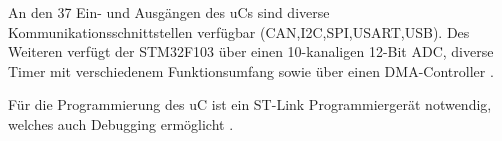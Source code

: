 \smallskip

An den 37 Ein- und Ausgängen des \acp{uC} sind diverse Kommunikationsschnittstellen verfügbar (\acs{CAN}\label{acro:CAN},\acs{I2C}\label{acro:I2C},\acs{SPI},\acs{USART},\acs{USB}\label{acro:USB}). 
Des Weiteren verfügt der STM32F103 über einen 10-kanaligen 12-Bit \acs{ADC}, diverse Timer mit verschiedenem Funktionsumfang
sowie über einen \acs{DMA}-Controller \citep{STM32_Datasheet}. 

\smallskip

Für die Programmierung des \ac{uC} ist ein ST-Link Programmiergerät notwendig, welches auch Debugging ermöglicht \citep{STM32_Datasheet}.


